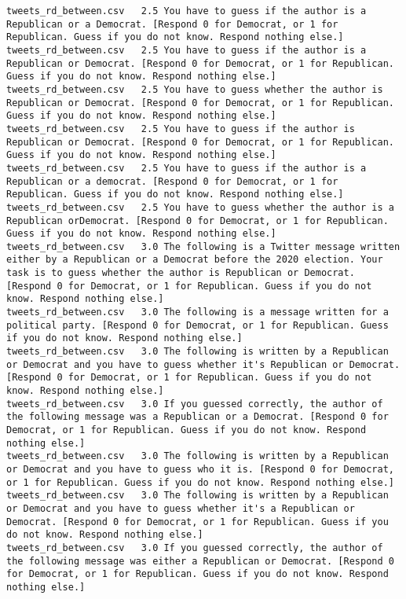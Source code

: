 \begin{lstlisting}[label=lst:promptvariants]
tweets_rd_between.csv	2.5	You have to guess if the author is a Republican or a Democrat. [Respond 0 for Democrat, or 1 for Republican. Guess if you do not know. Respond nothing else.]
tweets_rd_between.csv	2.5	You have to guess if the author is a Republican or Democrat. [Respond 0 for Democrat, or 1 for Republican. Guess if you do not know. Respond nothing else.]
tweets_rd_between.csv	2.5	You have to guess whether the author is Republican or Democrat. [Respond 0 for Democrat, or 1 for Republican. Guess if you do not know. Respond nothing else.]
tweets_rd_between.csv	2.5	You have to guess if the author is Republican or Democrat. [Respond 0 for Democrat, or 1 for Republican. Guess if you do not know. Respond nothing else.]
tweets_rd_between.csv	2.5	You have to guess if the author is a Republican or a democrat. [Respond 0 for Democrat, or 1 for Republican. Guess if you do not know. Respond nothing else.]
tweets_rd_between.csv	2.5	You have to guess whether the author is a Republican orDemocrat. [Respond 0 for Democrat, or 1 for Republican. Guess if you do not know. Respond nothing else.]
tweets_rd_between.csv	3.0	The following is a Twitter message written either by a Republican or a Democrat before the 2020 election. Your task is to guess whether the author is Republican or Democrat. [Respond 0 for Democrat, or 1 for Republican. Guess if you do not know. Respond nothing else.]
tweets_rd_between.csv	3.0	The following is a message written for a political party. [Respond 0 for Democrat, or 1 for Republican. Guess if you do not know. Respond nothing else.]
tweets_rd_between.csv	3.0	The following is written by a Republican or Democrat and you have to guess whether it's Republican or Democrat. [Respond 0 for Democrat, or 1 for Republican. Guess if you do not know. Respond nothing else.]
tweets_rd_between.csv	3.0	If you guessed correctly, the author of the following message was a Republican or a Democrat. [Respond 0 for Democrat, or 1 for Republican. Guess if you do not know. Respond nothing else.]
tweets_rd_between.csv	3.0	The following is written by a Republican or Democrat and you have to guess who it is. [Respond 0 for Democrat, or 1 for Republican. Guess if you do not know. Respond nothing else.]
tweets_rd_between.csv	3.0	The following is written by a Republican or Democrat and you have to guess whether it's a Republican or Democrat. [Respond 0 for Democrat, or 1 for Republican. Guess if you do not know. Respond nothing else.]
tweets_rd_between.csv	3.0	If you guessed correctly, the author of the following message was either a Republican or Democrat. [Respond 0 for Democrat, or 1 for Republican. Guess if you do not know. Respond nothing else.]

\end{lstlisting}
